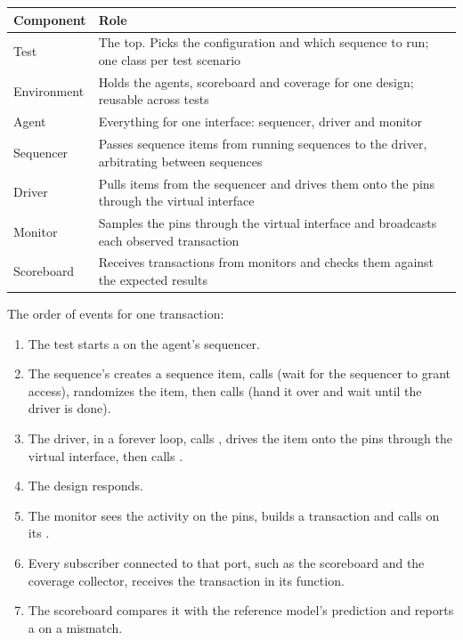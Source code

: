 \begin{center}
\begin{tabular}{ll}
\toprule
Component & Role \\
\midrule
Test & The top. Picks the configuration and which sequence to run; one class per test scenario \\
Environment & Holds the agents, scoreboard and coverage for one design; reusable across tests \\
Agent & Everything for one interface: sequencer, driver and monitor \\
Sequencer & Passes sequence items from running sequences to the driver, arbitrating between sequences \\
Driver & Pulls items from the sequencer and drives them onto the pins through the virtual interface \\
Monitor & Samples the pins through the virtual interface and broadcasts each observed transaction \\
Scoreboard & Receives transactions from monitors and checks them against the expected results \\
\bottomrule
\end{tabular}
\end{center}

The order of events for one transaction:
\begin{enumerate}
  \item The test starts a  on the agent's sequencer.
  \item The sequence's  creates a sequence item, calls  (wait for the sequencer to grant access), randomizes the item, then calls  (hand it over and wait until the driver is done).
  \item The driver, in a forever loop, calls , drives the item onto the pins through the virtual interface, then calls .
  \item The design responds.
  \item The monitor sees the activity on the pins, builds a transaction and calls  on its .
  \item Every subscriber connected to that port, such as the scoreboard and the coverage collector, receives the transaction in its  function.
  \item The scoreboard compares it with the reference model's prediction and reports a  on a mismatch.
\end{enumerate}

